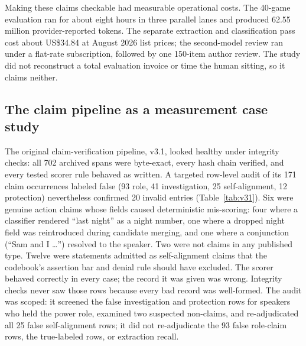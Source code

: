 \documentclass[11pt]{article}
\begin{document}
Making these claims checkable had measurable operational costs. The 40-game evaluation ran for about eight hours in three parallel lanes and produced 62.55 million provider-reported tokens. The separate extraction and classification pass cost about US\$34.84 at August 2026 list prices; the second-model review ran under a flat-rate subscription, followed by one 150-item author review. The study did not reconstruct a total evaluation invoice or time the human sitting, so it claims neither.

\subsection{The claim pipeline as a measurement case study}

The original claim-verification pipeline, v3.1, looked healthy under integrity checks: all 702 archived spans were byte-exact, every hash chain verified, and every tested scorer rule behaved as written. A targeted row-level audit of its 171 claim occurrences labeled false (93 role, 41 investigation, 25 self-alignment, 12 protection) nevertheless confirmed 20 invalid entries (Table~\ref{tab:v31}). Six were genuine action claims whose fields caused deterministic mis-scoring: four where a classifier rendered ``last night'' as a night number, one where a dropped night field was reintroduced during candidate merging, and one where a conjunction (``Sam and I \ldots'') resolved to the speaker. Two were not claims in any published type. Twelve were statements admitted as self-alignment claims that the codebook's assertion bar and denial rule should have excluded. The scorer behaved correctly in every case; the record it was given was wrong. Integrity checks never saw those rows because every bad record was well-formed. The audit was scoped: it screened the false investigation and protection rows for speakers who held the power role, examined two suspected non-claims, and re-adjudicated all 25 false self-alignment rows; it did not re-adjudicate the 93 false role-claim rows, the true-labeled rows, or extraction recall.
\end{document}
